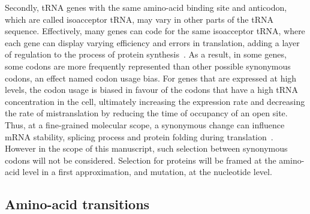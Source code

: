 Secondly, \acrshort{tRNA} genes with the same amino-acid binding site and anticodon, which are called isoacceptor \acrshort{tRNA}, may vary in other parts of the \acrshort{tRNA} sequence.
Effectively, many genes can code for the same isoacceptor \acrshort{tRNA}, where each gene can display varying efficiency and errors in translation, adding a layer of regulation to the process of protein synthesis~\citep{Lowe1997,Chan2008,Juhling2008,Lin2019}.
As a result, in some genes, some \glspl{codon} are more frequently represented than other possible \gls{synonymous} \glspl{codon}, an effect named \gls{codon} usage bias.
For genes that are expressed at high levels, the \gls{codon} usage is biased in favour of the \glspl{codon} that have a high \acrshort{tRNA} concentration in the cell, ultimately increasing the expression rate and decreasing the rate of mistranslation by reducing the time of occupancy of an open site.
Thus, at a fine-grained molecular scope, a \gls{synonymous} change can influence mRNA stability, splicing process and protein folding during translation~\citep{Plotkin2011, Rak2018}.
However in the scope of this manuscript, such selection between \gls{synonymous} \glspl{codon} will not be considered.
Selection for proteins will be framed at the amino-acid level in a first approximation, and mutation, at the nucleotide level.

\subsection{Amino-acid transitions}

